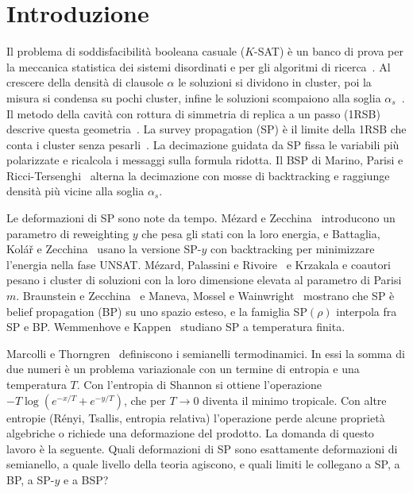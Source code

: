 \section{Introduzione}
\label{sec:intro}

Il problema di soddisfacibilità booleana casuale ($K$-SAT) è un banco di prova per la meccanica statistica dei sistemi disordinati e per gli algoritmi di ricerca~\citep{mezard2009information}.
Al crescere della densità di clausole $\alpha$ le soluzioni si dividono in cluster, poi la misura si condensa su pochi cluster, infine le soluzioni scompaiono alla soglia $\alpha_s$~\citep{mezard2002analytic,krzakala2007clusters,montanari2008clusters}.
Il metodo della cavità con rottura di simmetria di replica a un passo (1RSB) descrive questa geometria~\citep{mezard2001bethe,mezard2003cavity}.
La survey propagation (SP) è il limite della 1RSB che conta i cluster senza pesarli~\citep{mezard2002analytic,mezard2002random,braunstein2005survey}.
La decimazione guidata da SP fissa le variabili più polarizzate e ricalcola i messaggi sulla formula ridotta.
Il BSP di Marino, Parisi e Ricci-Tersenghi~\citep{marino2016bsp} alterna la decimazione con mosse di backtracking e raggiunge densità più vicine alla soglia $\alpha_s$.

Le deformazioni di SP sono note da tempo.
Mézard e Zecchina~\citep{mezard2002random} introducono un parametro di reweighting $y$ che pesa gli stati con la loro energia, e Battaglia, Kolář e Zecchina~\citep{battaglia2004minimizing} usano la versione SP-$y$ con backtracking per minimizzare l'energia nella fase UNSAT.
Mézard, Palassini e Rivoire~\citep{mezard2005landscape} e Krzakala e coautori~\citep{krzakala2007clusters} pesano i cluster di soluzioni con la loro dimensione elevata al parametro di Parisi $m$.
Braunstein e Zecchina~\citep{braunstein2004surveybp} e Maneva, Mossel e Wainwright~\citep{maneva2007survey} mostrano che SP è belief propagation (BP) su uno spazio esteso, e la famiglia SP$(\rho)$ interpola fra SP e BP.
Wemmenhove e Kappen~\citep{wemmenhove2006finite} studiano SP a temperatura finita.

Marcolli e Thorngren~\citep{marcolli2014thermodynamic} definiscono i semianelli termodinamici.
In essi la somma di due numeri è un problema variazionale con un termine di entropia e una temperatura $T$.
Con l'entropia di Shannon si ottiene l'operazione $-T\log(e^{-x/T}+e^{-y/T})$, che per $T\to 0$ diventa il minimo tropicale.
Con altre entropie (Rényi, Tsallis, entropia relativa) l'operazione perde alcune proprietà algebriche o richiede una deformazione del prodotto.
La domanda di questo lavoro è la seguente.
Quali deformazioni di SP sono esattamente deformazioni di semianello, a quale livello della teoria agiscono, e quali limiti le collegano a SP, a BP, a SP-$y$ e a BSP?

